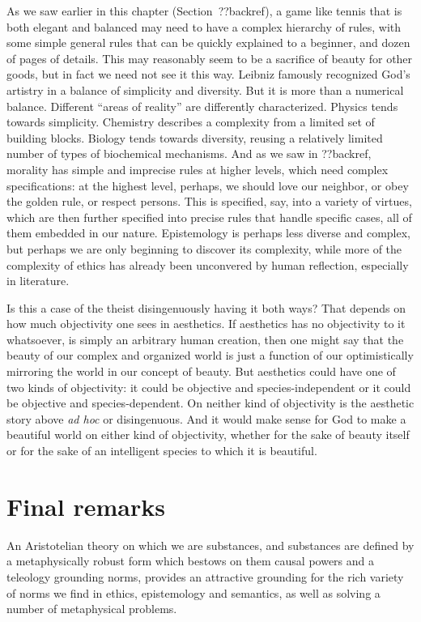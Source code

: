 As we saw earlier in this chapter (Section~??backref), a game like tennis that is both elegant and balanced may need 
to have a complex hierarchy of rules, with some simple general rules that can be quickly explained to a beginner, and 
dozen of pages of details. This may reasonably seem to be a sacrifice of beauty for other goods, but in fact we need not see it this way. Leibniz famously recognized God's artistry in a balance of simplicity and diversity. But it is more than a numerical balance. Different ``areas of reality'' are differently characterized. Physics tends towards simplicity. Chemistry describes a complexity from 
a limited set of building blocks. Biology tends towards diversity, reusing a relatively limited number of types of biochemical 
mechanisms. And as we saw in ??backref, morality has simple and imprecise rules at higher levels, which need complex 
specifications: at the highest level, perhaps, we should love our neighbor, or obey the golden rule, or respect persons. This 
is specified, say, into a variety of virtues, which are then further specified into precise rules that handle specific cases,
all of them embedded in our nature. Epistemology is perhaps less diverse and complex, but perhaps we are only beginning to 
discover its complexity, while more of the complexity of ethics has already been unconvered by human reflection, especially in literature. 

Is this a case of the theist disingenuously having it both ways? That depends on how much objectivity one sees in aesthetics.
If aesthetics has no objectivity to it whatsoever, is simply an arbitrary human creation, then one might say that the beauty 
of our complex and organized world is just a function of our optimistically mirroring the world in our concept of beauty.
But aesthetics could have one of two kinds of objectivity: it could be objective and species-independent or it could be 
objective and species-dependent. On neither kind of objectivity is the aesthetic story above \textit{ad hoc} or disingenuous.
And it would make sense for God to make a beautiful world on either kind of objectivity, whether for the sake of beauty itself
or for the sake of an intelligent species to which it is beautiful.

\section{Final remarks}
An Aristotelian theory on which we are substances, and substances are defined by a metaphysically robust form which bestows
on them causal powers and a teleology grounding norms, provides an attractive grounding for the rich variety of norms we 
find in ethics, epistemology and semantics, as well as solving a number of metaphysical problems. 

